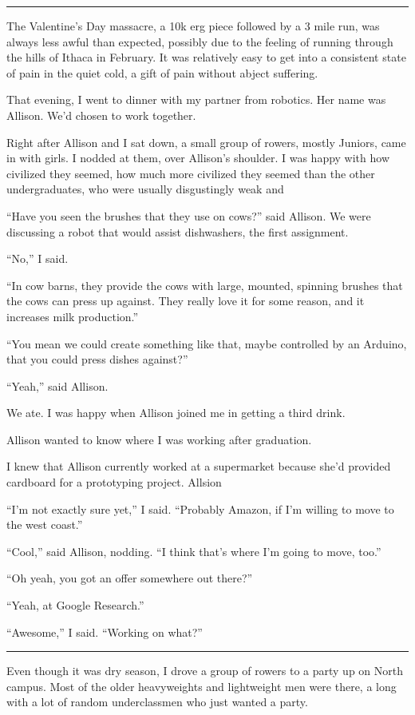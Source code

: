 \plainfancybreak{12pt}{2}{* * *}

The Valentine's Day massacre, a 10k erg piece followed by a 3 mile run, was
always less awful than expected, possibly due to the feeling of running through
the hills of Ithaca in February.  It was relatively easy to get into a
consistent state of pain in the quiet cold, a gift of pain without abject
suffering. 

That evening, I went to dinner with my partner from robotics.  Her name was
Allison.  We'd chosen to work together.  

Right after Allison and I sat down, a small group of rowers, mostly Juniors,
came in with girls.  I nodded at them, over Allison's shoulder.  I was happy
with how civilized they seemed, how much more civilized they seemed than the
other undergraduates, who were usually disgustingly weak and

``Have you seen the brushes that they use on cows?'' said Allison.  We were
discussing a robot that would assist dishwashers, the first assignment.

``No,'' I said.

``In cow barns, they provide the cows with large, mounted, spinning brushes that
the cows can press up against.  They really love it for some reason, and it
increases milk production.''

``You mean we could create something like that, maybe controlled by an Arduino,
that you could press dishes against?''

``Yeah,'' said Allison.

We ate.  I was happy when Allison joined me in getting a third drink.

Allison wanted to know where I was working after graduation.

I knew that Allison currently worked at a supermarket because she'd provided
cardboard for a prototyping project.  Allsion 

``I'm not exactly sure yet,'' I said.  ``Probably Amazon, if I'm willing to move
to the west coast.''

``Cool,'' said Allison, nodding.  ``I think that's where I'm going to move,
too.''

``Oh yeah, you got an offer somewhere out there?''

``Yeah, at Google Research.''

``Awesome,'' I said.  ``Working on what?''

\plainfancybreak{12pt}{2}{* * *}

Even though it was dry season, I drove a group of rowers to a party up on North
campus.  Most of the older heavyweights and lightweight men were there, a long
with a lot of random underclassmen who just wanted a party.

